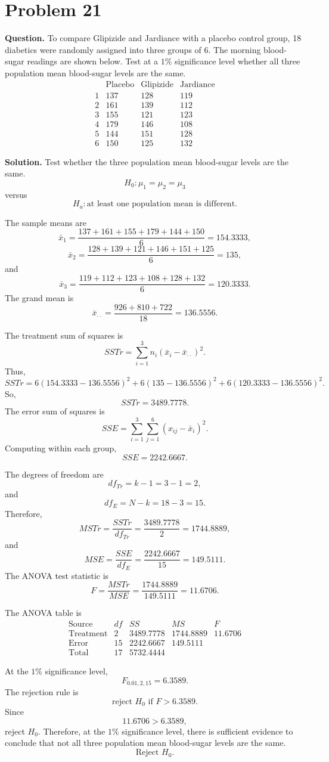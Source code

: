 \documentclass[11pt]{article}
\begin{document}
\section*{Problem 21}

\textbf{Question.} To compare Glipizide and Jardiance with a placebo control group, 18 diabetics were randomly assigned into three groups of 6. The morning blood-sugar readings are shown below. Test at a $1\%$ significance level whether all three population mean blood-sugar levels are the same.
\[
\begin{array}{c|ccc}
& \text{Placebo} & \text{Glipizide} & \text{Jardiance}\\
\hline
1 & 137 & 128 & 119\\
2 & 161 & 139 & 112\\
3 & 155 & 121 & 123\\
4 & 179 & 146 & 108\\
5 & 144 & 151 & 128\\
6 & 150 & 125 & 132
\end{array}
\]

\textbf{Solution.} Test whether the three population mean blood-sugar levels are the same.
\[
H_0:\mu_1=\mu_2=\mu_3
\]
versus
\[
H_a:\text{at least one population mean is different}.
\]

The sample means are
\[
\bar x_1=\frac{137+161+155+179+144+150}{6}=154.3333,
\]
\[
\bar x_2=\frac{128+139+121+146+151+125}{6}=135,
\]
and
\[
\bar x_3=\frac{119+112+123+108+128+132}{6}=120.3333.
\]
The grand mean is
\[
\bar x_{\cdot\cdot}=\frac{926+810+722}{18}=136.5556.
\]

The treatment sum of squares is
\[
SSTr=\sum_{i=1}^{3}n_i(\bar x_i-\bar x_{\cdot\cdot})^2.
\]
Thus,
\[
SSTr=6(154.3333-136.5556)^2+6(135-136.5556)^2+6(120.3333-136.5556)^2.
\]
So,
\[
SSTr=3489.7778.
\]
The error sum of squares is
\[
SSE=\sum_{i=1}^{3}\sum_{j=1}^{6}(x_{ij}-\bar x_i)^2.
\]
Computing within each group,
\[
SSE=2242.6667.
\]

The degrees of freedom are
\[
df_{Tr}=k-1=3-1=2,
\]
and
\[
df_E=N-k=18-3=15.
\]
Therefore,
\[
MSTr=\frac{SSTr}{df_{Tr}}=\frac{3489.7778}{2}=1744.8889,
\]
and
\[
MSE=\frac{SSE}{df_E}=\frac{2242.6667}{15}=149.5111.
\]
The ANOVA test statistic is
\[
F=\frac{MSTr}{MSE}=\frac{1744.8889}{149.5111}=11.6706.
\]

The ANOVA table is
\[
\begin{array}{c|cccc}
\text{Source} & df & SS & MS & F\\
\hline
\text{Treatment} & 2 & 3489.7778 & 1744.8889 & 11.6706\\
\text{Error} & 15 & 2242.6667 & 149.5111 & \\
\text{Total} & 17 & 5732.4444 & &
\end{array}
\]

At the $1\%$ significance level,
\[
F_{0.01,2,15}=6.3589.
\]
The rejection rule is
\[
\text{reject }H_0\text{ if }F>6.3589.
\]
Since
\[
11.6706>6.3589,
\]
reject $H_0$. Therefore, at the $1\%$ significance level, there is sufficient evidence to conclude that not all three population mean blood-sugar levels are the same.
\[
\boxed{\text{Reject }H_0.}
\]
\end{document}
